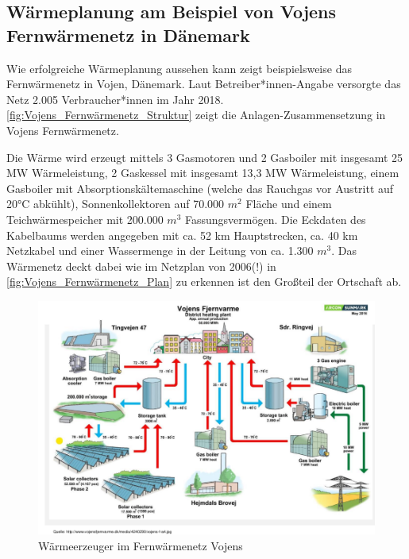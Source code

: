			
		\subsection{Wärmeplanung am Beispiel von Vojens Fernwärmenetz in Dänemark}
		\label{sec:Grundlagen:Wärmewende_in_D:Beispiel_Wärmeplan_Fernwärmenetz}
			
			Wie erfolgreiche Wärmeplanung aussehen kann zeigt beispielsweise das Fernwärmenetz in Vojen, Dänemark. Laut Betreiber*innen-Angabe versorgte das Netz 2.005 Verbraucher*innen im Jahr 2018. \autoref{fig:Vojens_Fernwärmenetz_Struktur} zeigt die Anlagen-Zusammensetzung in Vojens Fernwärmenetz. \cite{web_vojens_om_os}
			
			Die Wärme wird erzeugt mittels 3 Gasmotoren und 2 Gasboiler mit insgesamt 25 MW Wärmeleistung, 2 Gaskessel mit insgesamt 13,3 MW Wärmeleistung, einem Gasboiler mit Absorptionskältemaschine (welche das Rauchgas vor Austritt auf 20°C abkühlt), Sonnenkollektoren auf 70.000 $m^2$ Fläche und einem Teichwärmespeicher mit 200.000 $m^3$ Fassungsvermögen. Die Eckdaten des Kabelbaums werden angegeben mit ca. 52 km Hauptstrecken, ca. 40 km Netzkabel und einer Wassermenge in der Leitung von ca. 1.300 $m^3$. Das Wärmenetz deckt dabei wie im Netzplan von 2006(!) in \autoref{fig:Vojens_Fernwärmenetz_Plan} zu erkennen ist den Großteil der Ortschaft ab. 
			\cite{web_vojens_om_os}\cite{web_vojens_kedler_og_motorer}\cite{web_vojens_historie}

			
			\begin{figure}[H]
				\includegraphics[width=\linewidth]{Medien/own/Vojens_Fernwärme_Wärmeerzeuger.png}
				\caption{Wärmeerzeuger im Fernwärmenetz Vojens \cite[S.40]{wellenbrink_bruegging_2022_waermeleitplanung}}
				\label{fig:Vojens_Fernwärmenetz_Struktur}
			\end{figure}
				
